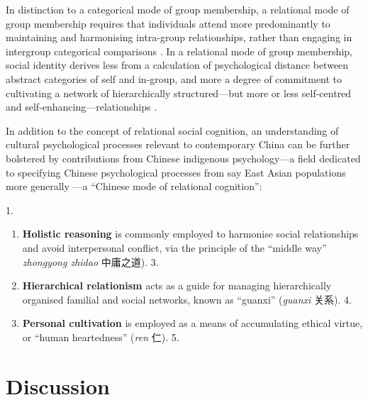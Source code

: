 \begin{CJK}{UTF8}{gbsn}
In distinction to a categorical mode of group membership, a relational mode of group membership requires that individuals attend more predominantly to maintaining and harmonising intra-group relationships, rather than engaging in intergroup categorical comparisons \citep{Yuki2003}.  In a relational mode of group membership, social identity derives less from a calculation of psychological distance between abstract categories of self and in-group, and more a degree of commitment to cultivating a network of hierarchically structured---but more or less self-centred and self-enhancing---relationships \citep{Liu2009,Nisbett2003}.

In addition to the concept of relational social cognition, an understanding of cultural psychological processes relevant to contemporary China can be further bolstered by contributions from Chinese indigenous psychology---a field dedicated to specifying Chinese psychological processes from say East Asian populations more generally \citep{Liu2009}—a ``Chinese mode of relational cognition'':

    1. \begin{enumerate}
    2.   \item \textbf{Holistic reasoning} is commonly employed to harmonise social relationships and avoid interpersonal conflict, via the principle of the  ``middle way'' \textit{zhongyong zhidao} 中庸之道).
    3.   \item \textbf{Hierarchical relationism} acts as a guide for managing hierarchically organised familial and social networks, known as ``guanxi'' (\textit{guanxi} 关系).
    4.   \item \textbf{Personal cultivation} is employed as a means of accumulating ethical virtue, or ``human heartedness'' (\textit{ren} 仁).
    5. \end{enumerate}

















\section{Discussion}

                                                          \end{CJK}
